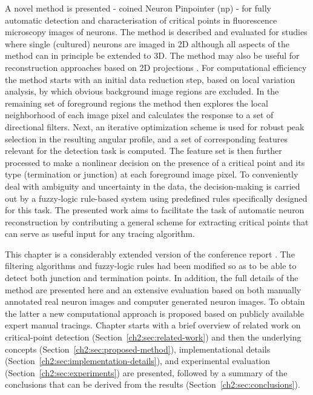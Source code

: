 A novel method is presented - coined Neuron Pinpointer (\gls{np}) - for fully automatic detection and characterisation of critical points in fluorescence microscopy images of neurons. The method is described and evaluated for studies where single (cultured) neurons are imaged in 2D although all aspects of the method can in principle be extended to 3D. The method may also be useful for reconstruction approaches based on 2D projections \cite{zhou2015neuron}. For computational efficiency the method starts with an initial data reduction step, based on local variation analysis, by which obvious background image regions are excluded. In the remaining set of foreground regions the method then explores the local neighborhood of each image pixel and calculates the response to a set of directional filters. Next, an iterative optimization scheme is used for robust peak selection in the resulting angular profile, and a set of corresponding features relevant for the detection task is computed. The feature set is then further processed to make a nonlinear decision on the presence of a critical point and its type (termination or junction) at each foreground image pixel. To conveniently deal with ambiguity and uncertainty in the data, the decision-making is carried out by a fuzzy-logic rule-based system using predefined rules specifically designed for this task. The presented work aims to facilitate the task of automatic neuron reconstruction by contributing a general scheme for extracting critical points that can serve as useful input for any tracing algorithm.

This chapter is a considerably extended version of the conference report \cite{radojevic2014fuzzy}. The filtering algorithms and fuzzy-logic rules had been modified so as to be able to detect both junction and termination points. In addition, the full details of the method are presented here and an extensive evaluation based on both manually annotated real neuron images and computer generated neuron images. To obtain the latter a new computational approach is proposed based on publicly available expert manual tracings. Chapter starts with a brief overview of related work on critical-point detection (Section~\ref{ch2:sec:related-work}) and then the underlying concepts (Section~\ref{ch2:sec:proposed-method}), implementational details (Section~\ref{ch2:sec:implementation-details}), and experimental evaluation (Section~\ref{ch2:sec:experiments}) are presented, followed by a summary of the conclusions that can be derived from the results (Section~\ref{ch2:sec:conclusions}).

